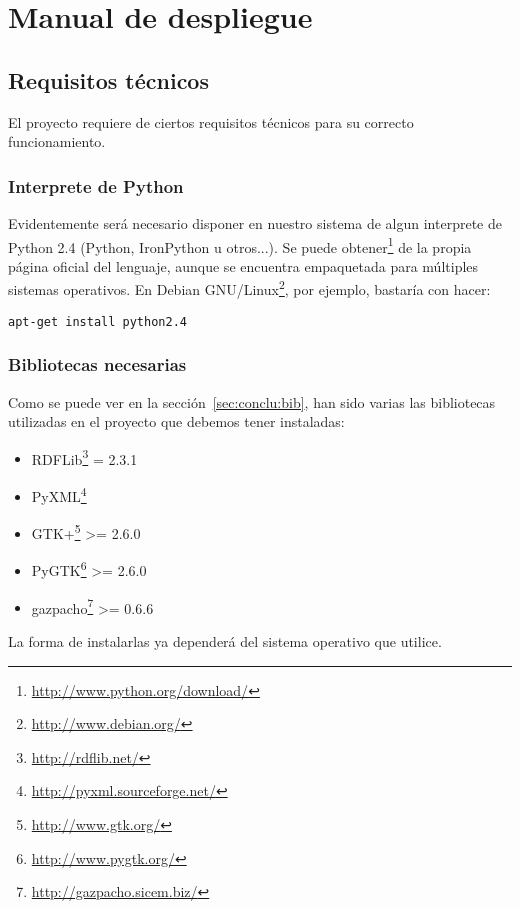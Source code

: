 
\section{Manual de despliegue}

\subsection*{Requisitos técnicos}

El proyecto requiere de ciertos requisitos técnicos para su correcto
funcionamiento.

\subsubsection*{Interprete de Python}

Evidentemente será necesario disponer en nuestro sistema de algun interprete
de Python 2.4 (Python, IronPython u otros...). Se puede 
obtener\footnote{\url{http://www.python.org/download/}} de la propia página 
oficial del lenguaje, aunque se encuentra empaquetada para múltiples sistemas 
operativos. En Debian GNU/Linux\footnote{\url{http://www.debian.org/}}, por 
ejemplo, bastaría con hacer:

\begin{center}
	\texttt{apt-get install python2.4}
\end{center}

\subsubsection*{Bibliotecas necesarias}

Como se puede ver en la sección~\ref{sec:conclu:bib}, han sido varias las
bibliotecas utilizadas en el proyecto que debemos tener instaladas:

\begin{itemize}
  \item RDFLib\footnote{\url{http://rdflib.net/}} = 2.3.1
  \item PyXML\footnote{\url{http://pyxml.sourceforge.net/}}
  \item GTK+\footnote{\url{http://www.gtk.org/}} >= 2.6.0
  \item PyGTK\footnote{\url{http://www.pygtk.org/}} >= 2.6.0
  \item gazpacho\footnote{\url{http://gazpacho.sicem.biz/}} >= 0.6.6
\end{itemize}

La forma de instalarlas ya dependerá del sistema operativo que utilice.


